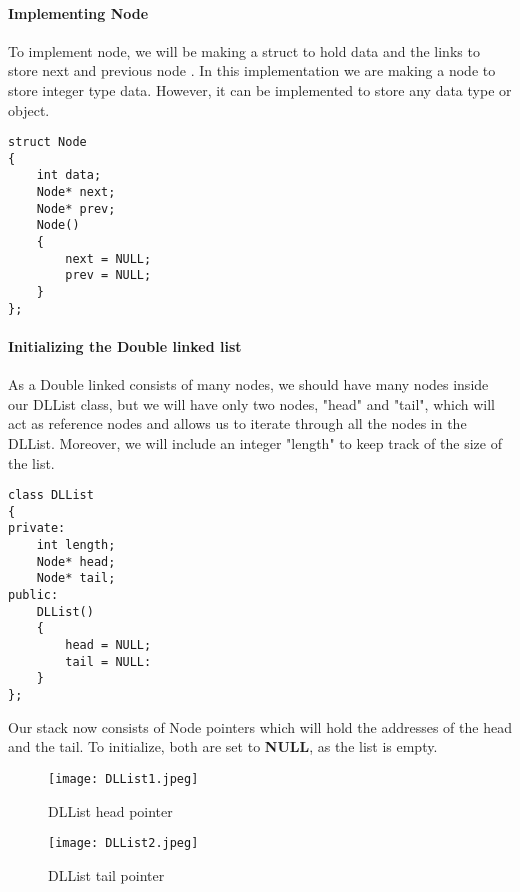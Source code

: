 \documentclass[11pt,fleqn]{book} %
\begin{document}
\paragraph{Implementing Node}
To implement node, we will be making a struct to hold data and the links to store next and previous node . In this implementation we are making a node to store integer type data. However, it can be implemented to store any data type or object.
\begin{lstlisting}
struct Node
{
	int data;
	Node* next;
	Node* prev;
	Node()
	{
		next = NULL;
		prev = NULL;
	}
};
\end{lstlisting}
\paragraph{Initializing the Double linked list}
As a Double linked consists of many nodes, we should have many nodes inside our DLList class, but we will have only two nodes, "head" and "tail", which will act as reference nodes and allows us to iterate through all the nodes in the DLList. Moreover, we will include an integer "length" to keep track of the size of the list.
\begin{lstlisting}
class DLList
{
private:
	int length;
	Node* head;
	Node* tail;
public:
	DLList()
	{
		head = NULL;
		tail = NULL:
	}
};
\end{lstlisting}
Our stack now consists of Node pointers which will hold the addresses of the head and the tail. To initialize, both are set to \textbf{NULL}, as the list is empty.
\begin{figure}[H]
	\centering
	\texttt{[image: DLList1.jpeg]}
	\caption{DLList head pointer}
\end{figure}
\begin{figure}[H]
	\centering
	\texttt{[image: DLList2.jpeg]}
	\caption{DLList tail pointer}
\end{figure}
\end{document}
